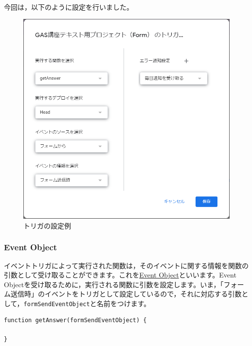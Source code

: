 \documentclass[uplatex,a4j]{jsarticle}
\begin{document}
今回は，以下のように設定を行いました。

\begin{figure}[H]
 \centering
 \includegraphics[keepaspectratio, scale=0.7]{images/trigger_edit.png}
 \caption{トリガの設定例}
 \label{fig:trigger_edit}
\end{figure}

\subsubsection{Event Object}

イベントトリガによって実行された関数は，そのイベントに関する情報を関数の引数として受け取ることができます。これを\href{https://developers.google.com/apps-script/guides/triggers/events?hl=en}{Event Object}といいます。Event Objectを受け取るために，実行される関数に引数を設定します。いま，「フォーム送信時」のイベントをトリガとして設定しているので，それに対応する引数として，\verb|formSendEventObject|と名前をつけます。

\begin{lstlisting}[basicstyle=\ttfamily\footnotesize,frame=single,caption=Event Object sample 1]
function getAnswer(formSendEventObject) {
  
}
\end{lstlisting}
\end{document}
